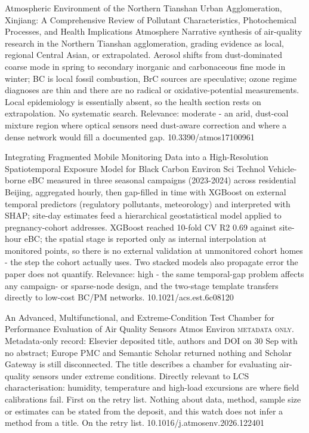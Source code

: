 \documentclass[10pt]{article}
\begin{document}
{Atmospheric Environment of the Northern Tianshan Urban Agglomeration, Xinjiang: A Comprehensive Review of Pollutant Characteristics, Photochemical Processes, and Health Implications}
{Atmosphere}
{Narrative synthesis of air-quality research in the Northern Tianshan agglomeration, grading evidence as local, regional Central Asian, or extrapolated. Aerosol shifts from dust-dominated coarse mode in spring to secondary inorganic and carbonaceous fine mode in winter; BC is local fossil combustion, BrC sources are speculative; ozone regime diagnoses are thin and there are no radical or oxidative-potential measurements. Local epidemiology is essentially absent, so the health section rests on extrapolation. No systematic search. Relevance: moderate - an arid, dust-coal mixture region where optical sensors need dust-aware correction and where a dense network would fill a documented gap.}
{10.3390/atmos17100961}

\par{}\baselineskip{}\baselineskip
{}

{Integrating Fragmented Mobile Monitoring Data into a High-Resolution Spatiotemporal Exposure Model for Black Carbon}
{Environ Sci Technol}
{Vehicle-borne eBC measured in three seasonal campaigns (2023-2024) across residential Beijing, aggregated hourly, then gap-filled in time with XGBoost on external temporal predictors (regulatory pollutants, meteorology) and interpreted with SHAP; site-day estimates feed a hierarchical geostatistical model applied to pregnancy-cohort addresses. XGBoost reached 10-fold CV R2 0.69 against site-hour eBC; the spatial stage is reported only as internal interpolation at monitored points, so there is no external validation at unmonitored cohort homes - the step the cohort actually uses. Two stacked models also propagate error the paper does not quantify. Relevance: high - the same temporal-gap problem affects any campaign- or sparse-node design, and the two-stage template transfers directly to low-cost BC/PM networks.}
{10.1021/acs.est.6c08120}

{An Advanced, Multifunctional, and Extreme-Condition Test Chamber for Performance Evaluation of Air Quality Sensors}
{Atmos Environ}
{\textsc{metadata only.} Metadata-only record: Elsevier deposited title, authors and DOI on 30 Sep with no abstract; Europe PMC and Semantic Scholar returned nothing and Scholar Gateway is still disconnected. The title describes a chamber for evaluating air-quality sensors under extreme conditions. Directly relevant to LCS characterisation: humidity, temperature and high-load excursions are where field calibrations fail. First on the retry list. Nothing about data, method, sample size or estimates can be stated from the deposit, and this watch does not infer a method from a title. On the retry list.}
{10.1016/j.atmosenv.2026.122401}
\end{document}
